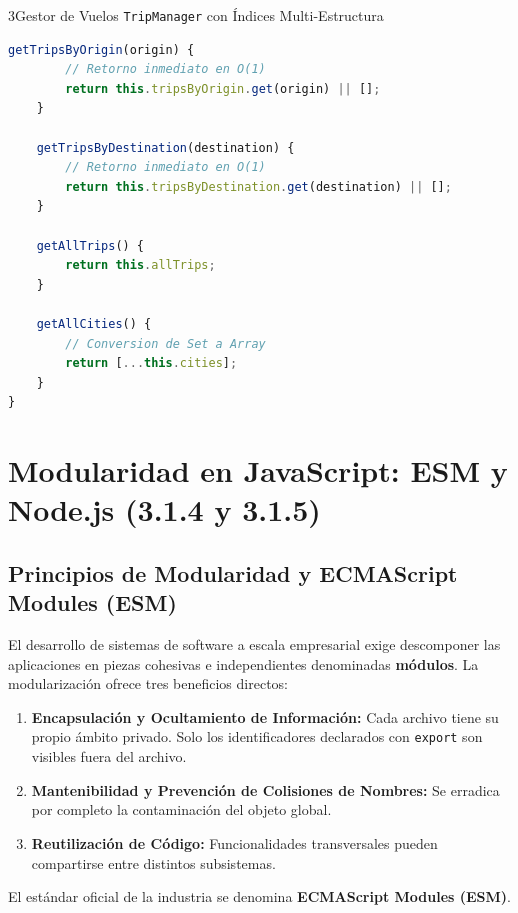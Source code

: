 \begin{ejercicioresuelto}{3}{Gestor de Vuelos \texttt{TripManager} con Índices Multi-Estructura}
\begin{lstlisting}[language=javascript, caption={Solución del Ejercicio 3 de Estructuras de Datos}]
    getTripsByOrigin(origin) {
        // Retorno inmediato en O(1)
        return this.tripsByOrigin.get(origin) || [];
    }

    getTripsByDestination(destination) {
        // Retorno inmediato en O(1)
        return this.tripsByDestination.get(destination) || [];
    }

    getAllTrips() {
        return this.allTrips;
    }

    getAllCities() {
        // Conversion de Set a Array
        return [...this.cities];
    }
}
\end{lstlisting}
\end{ejercicioresuelto}

\section{Modularidad en JavaScript: ESM y Node.js (3.1.4 y 3.1.5)}

\subsection{Principios de Modularidad y ECMAScript Modules (ESM)}

El desarrollo de sistemas de software a escala empresarial exige descomponer las aplicaciones en piezas cohesivas e independientes denominadas \textbf{módulos}. La modularización ofrece tres beneficios directos:
\begin{enumerate}
    \item \textbf{Encapsulación y Ocultamiento de Información:} Cada archivo tiene su propio ámbito privado. Solo los identificadores declarados con \texttt{export} son visibles fuera del archivo.
    \item \textbf{Mantenibilidad y Prevención de Colisiones de Nombres:} Se erradica por completo la contaminación del objeto global.
    \item \textbf{Reutilización de Código:} Funcionalidades transversales pueden compartirse entre distintos subsistemas.
\end{enumerate}

El estándar oficial de la industria se denomina \textbf{ECMAScript Modules (ESM)}.


